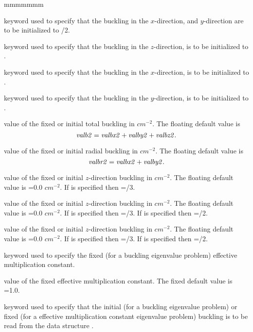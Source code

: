 \begin{ListeDeDescription}{mmmmmmm}
\item[\moc{R}] keyword used to specify that the buckling in the $x$-direction,
and $y$-direction are to be initialized to /2.

\item[\moc{Z}] keyword used to specify that the buckling in the $z$-direction,
is to be initialized to .

\item[\moc{X}] keyword used to specify that the buckling in the $x$-direction,
is to be initialized to .

\item[\moc{Y}] keyword used to specify that the buckling in the $y$-direction,
is to be initialized to .

\item[\dusa{valb2}] value of the fixed or initial total buckling in $cm^{-2}$.
The floating default value is
$${\it valb2}={\it valbx2}+{\it valby2}+{\it valbz2}.$$

\item[\dusa{valbr2}] value of the fixed or initial radial buckling in
$cm^{-2}$. The floating default value is
$${\it valbr2}={\it valbx2}+{\it valby2}.$$

\item[\dusa{valbz2}] value of the fixed or initial $z$-direction buckling in
$cm^{-2}$. The floating default value is =0.0 $cm^{-2}$. If
 is specified then =/3.

\item[\dusa{valbx2}] value of the fixed or initial $z$-direction buckling in
$cm^{-2}$. The floating default value is =0.0 $cm^{-2}$. If
 is specified then =/3. If  is
specified then =/2.

\item[\dusa{valby2}] value of the fixed or initial $z$-direction buckling in
$cm^{-2}$. The floating default value is =0.0 $cm^{-2}$. If
 is specified then =/3. If  is
specified then =/2.

\item[\moc{KEFF}] keyword used to specify the fixed (for a buckling eigenvalue
problem) effective multiplication constant. 

\item[\dusa{valk}] value of the fixed effective multiplication constant. The
fixed default value is =1.0.

\item[\moc{IDEM}] keyword used to specify that the initial (for a buckling
eigenvalue problem) or fixed (for a effective multiplication constant eigenvalue
problem) buckling is to be read from the data structure . 

\end{ListeDeDescription}
\eject
